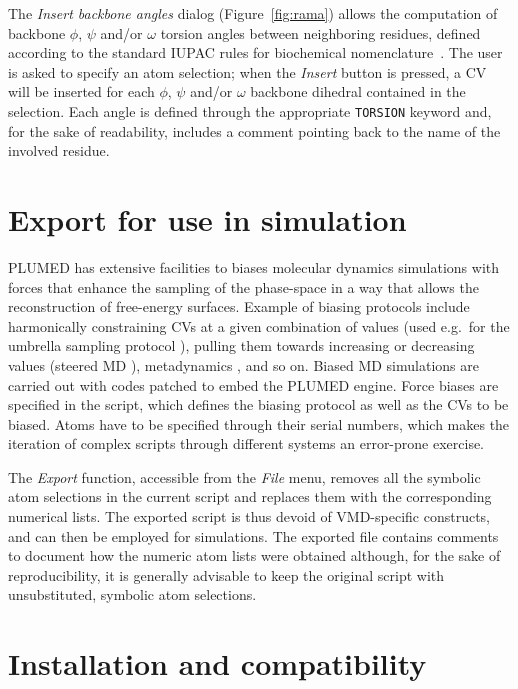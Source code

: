 \documentclass[preprint,review,11pt]{elsarticle}
\begin{document}
The \emph{Insert backbone angles} dialog (Figure~\ref{fig:rama})
allows the computation of backbone $\phi$, $\psi$ and/or $\omega$
torsion angles between neighboring residues, defined according to the
standard IUPAC rules for biochemical nomenclature~\cite{IUPAC}.  The
user is asked to specify an atom selection; when the \emph{Insert}
button is pressed, a CV will be inserted for each $\phi$, $\psi$
and/or $\omega$ backbone dihedral contained in the selection. Each
angle is defined through the appropriate \texttt{TORSION} keyword and,
for the sake of readability, includes a comment pointing back to the
name of the involved residue.






\section{Export for use in simulation}\label{sec:export-use-simul}

PLUMED has extensive facilities to biases molecular dynamics
simulations with forces that enhance the sampling of the phase-space
in a way that allows the reconstruction of free-energy
surfaces. Example of biasing protocols include harmonically
constraining CVs at a given combination of values (used e.g.\ for the
umbrella sampling protocol \cite{Torrie_Valleau_1977}), pulling them
towards increasing or decreasing values (steered MD
\cite{Isralewitz_Gao_Schulten_2001,Giorgino_2011}), metadynamics
\cite{Laio_Parrinello_2002}, and so on. Biased MD simulations are
carried out with codes patched to embed the PLUMED engine. Force
biases are specified in the script, which defines the biasing protocol
as well as the CVs to be biased.  Atoms have to be specified
through their serial numbers, which makes the iteration of complex
scripts through different systems an error-prone exercise.

The \emph{Export} function, accessible from the \emph{File} menu, removes all
the symbolic atom selections in the current script and replaces them
with the corresponding numerical lists. The exported script is thus
devoid of VMD-specific constructs, and can then be employed for
simulations.  The exported file contains comments to document how the
numeric atom lists were obtained although, for the sake of
reproducibility, it is generally advisable to keep the original
script with unsubstituted, symbolic atom selections.



\section{Installation and compatibility}
\end{document}
